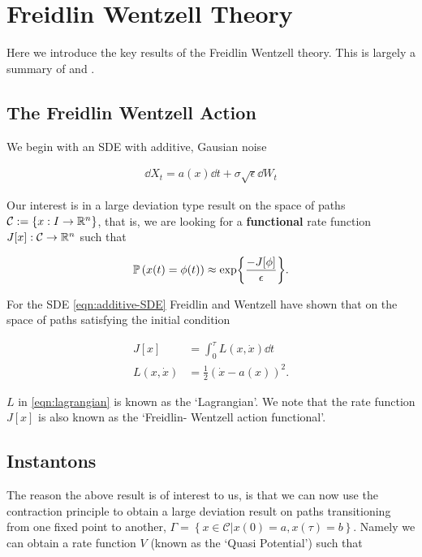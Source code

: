 \section{Freidlin Wentzell Theory}

\newcommand{\pathspace}{\mathcal{C}}

Here we introduce the key results of the Freidlin Wentzell theory. This is largely a summary of  \cite{Touchette2009} \cite{Bouchet2014} \cite{PoppeJr2018}and \cite{Grafke2019}.\\

\subsection{The Freidlin Wentzell Action}

We begin with an SDE with additive, Gausian noise

\begin{align}
    \dd X_t = a(x) \dd t + \sigma \sqrt{\epsilon}  \dd W_t \label{eqn:additive-SDE}
\end{align}

Our interest is in a large deviation type result on the space of paths $\pathspace := \left\{x: I \to \R^n \right\}$, that is, we are looking for a \textbf{functional} rate function $J[x]: \pathspace \to \R^n$ such that

\begin{align}
    \mathbb{P} \left(x(t) = \phi(t)\right) \approx \exp{ \frac{-J[\phi]}{\epsilon} }.
\end{align}

For the SDE \ref{eqn:additive-SDE} Freidlin and Wentzell have shown that on the space of paths satisfying the initial condition

\begin{align}
    J[x] &= \int_0^\tau L(x, \dot{x}) \dd t\\
    L(x, \dot{x}) &= \frac{1}{2} (\dot{x} - a(x) )^2. \label{eqn:lagrangian}
\end{align}

$L$ in \ref{eqn:lagrangian} is known as the `Lagrangian'. We note that the rate function $J[x]$ is also known as the `Freidlin- Wentzell action functional'.

\subsection{Instantons}


The reason the above result is of interest to us, is that we can now use the contraction principle to obtain a large deviation result on paths transitioning from one fixed point to another, $\Gamma = \left\{x \in \pathspace | x(0) = a, x(\tau) = b \right\}$. Namely we can obtain a rate function $V$ (known as the `Quasi Potential') such that


